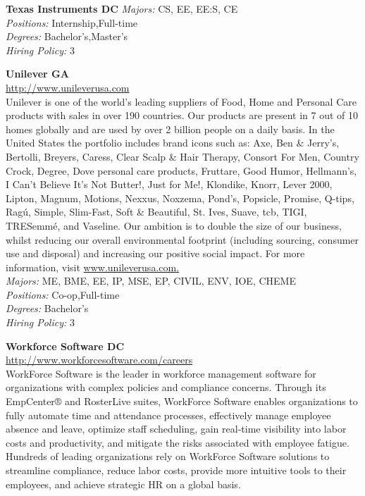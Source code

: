 \documentclass[twoside]{article}
\begin{document}
\begin{center}
\begin{multicols}{2}
\begin{minipage}{.95\columnwidth}{\Large\bf Texas Instruments \hfill DC}
    \emph{Majors:} CS, EE, EE:S, CE\\
    \emph{Positions:} Internship,Full-time\\
    \emph{Degrees:} Bachelor's,Master's\\
    \emph{Hiring Policy:} 3\\
\end{minipage}
 \begin{minipage}{.95\columnwidth}{\Large\bf Unilever \hfill GA}\\
    \url{http://www.unileverusa.com}\\
    Unilever is one of the world’s leading suppliers of Food, Home and Personal Care products with sales in over 190 countries. Our products are present in 7 out of 10 homes globally and are used by over 2 billion people on a daily basis. In the United States the portfolio includes brand icons such as: Axe, Ben \& Jerry’s, Bertolli, Breyers, Caress, Clear Scalp \& Hair Therapy, Consort For Men, Country Crock, Degree, Dove personal care products, Fruttare, Good Humor, Hellmann’s, I Can’t Believe It’s Not Butter!, Just for Me!, Klondike, Knorr, Lever 2000, Lipton, Magnum, Motions, Nexxus, Noxzema, Pond’s, Popsicle, Promise, Q-tips, Ragú, Simple, Slim-Fast, Soft \& Beautiful, St. Ives, Suave, tcb, TIGI, TRESemmé, and Vaseline. Our ambition is to double the size of our business, whilst reducing our overall environmental footprint (including sourcing, consumer use and disposal) and increasing our positive social impact. For more information, visit \url{www.unileverusa.com.}\\
    \emph{Majors:} ME, BME, EE, IP, MSE, EP, CIVIL, ENV, IOE, CHEME\\
    \emph{Positions:} Co-op,Full-time\\
    \emph{Degrees:} Bachelor's\\
    \emph{Hiring Policy:} 3\\
\end{minipage}
 \begin{minipage}{.95\columnwidth}{\Large\bf Workforce Software \hfill DC}\\
    \url{http://www.workforcesoftware.com/careers}\\
    WorkForce Software is the leader in workforce management software for organizations with complex policies and compliance concerns. Through its EmpCenter® and RosterLive suites, WorkForce Software enables organizations to fully automate time and attendance processes, effectively manage employee absence and leave, optimize staff scheduling, gain real-time visibility into labor costs and productivity, and mitigate the risks associated with employee fatigue. Hundreds of leading organizations rely on WorkForce Software solutions to streamline compliance, reduce labor costs, provide more intuitive tools to their employees, and achieve strategic HR on a global basis.\\

\end{minipage}
\end{multicols}
\end{center}
\end{document}
